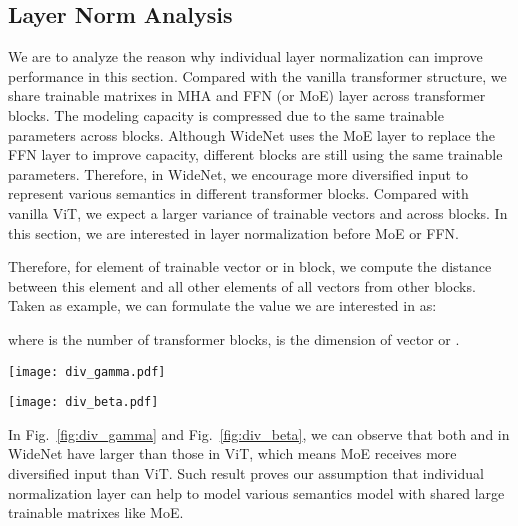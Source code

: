 \documentclass[letterpaper]{article} \usepackage{aaai22}  \usepackage{times}  \usepackage{helvet}  \usepackage{courier}  \usepackage[hyphens]{url}  \usepackage{graphicx} \urlstyle{rm} \def\UrlFont{\rm}  \usepackage{natbib}  \usepackage{caption} \DeclareCaptionStyle{ruled}{labelfont=normalfont,labelsep=colon,strut=off} \frenchspacing  \setlength{\pdfpagewidth}{8.5in}  \setlength{\pdfpageheight}{11in}  \usepackage{algorithm}
\begin{document}
\subsection{Layer Norm Analysis} 

We are to analyze the reason why individual layer normalization can improve performance in this section. Compared with the vanilla transformer structure, we share trainable matrixes in MHA and FFN (or MoE) layer across transformer blocks. The modeling capacity is compressed due to the same trainable parameters across blocks. Although WideNet uses the MoE layer to replace the FFN layer to improve capacity, different blocks are still using the same trainable parameters. Therefore, in WideNet, we encourage more diversified input to represent various semantics in different transformer blocks. Compared with vanilla ViT, we expect a larger variance of trainable vectors  and  across blocks. In this section, we are interested in layer normalization before MoE or FFN.

Therefore, for  element of trainable vector  or  in  block, we compute the distance between this element and all other elements of all vectors from other blocks. Taken  as example, we can formulate the value  we are interested in as:


where  is the number of transformer blocks,  is the dimension of vector  or .

\begin{figure*}
\centering
\begin{minipage}[b]{.45\textwidth}
\texttt{[image: div\_gamma.pdf]}
\caption{Divergence of  with LayerNorm layers.}\label{fig:div_gamma}
\end{minipage}\hfill
\begin{minipage}[b]{.45\textwidth}
\texttt{[image: div\_beta.pdf]}
\caption{Divergence of  with LayerNorm layers.}\label{fig:div_beta}
\end{minipage}
\end{figure*}

In Fig.~\ref{fig:div_gamma} and Fig.~\ref{fig:div_beta}, we can observe that both  and  in WideNet have larger  than those in ViT, which means MoE receives more diversified input than ViT. Such result proves our assumption that individual normalization layer can help to model various semantics model with shared large trainable matrixes like MoE. 
\end{document}
